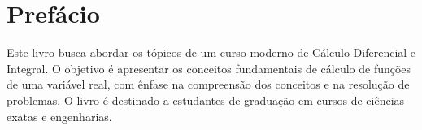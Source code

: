 
\chapter*{Prefácio}\label{prefacio}

Este livro busca abordar os tópicos de um curso moderno de Cálculo Diferencial e Integral. O objetivo é apresentar os conceitos fundamentais de cálculo de funções de uma variável real, com ênfase na compreensão dos conceitos e na resolução de problemas. O livro é destinado a estudantes de graduação em cursos de ciências exatas e engenharias.
